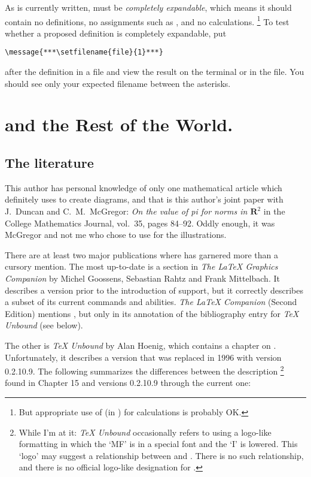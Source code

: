 \documentclass[letterpaper]{article}
\begin{document}
As \mfp{} is currently written,  must be
\emph{completely expandable}, which means it should contain no
definitions, no assignments such as , and no
calculations.%
    \footnote{But appropriate use of  (in \eTeX) for
    calculations is probably OK.}
To test whether a proposed definition is completely
expandable, put
\begin{verbatim}
\message{***\setfilename{file}{1}***}
\end{verbatim}
after the definition in a  file and view the result on the
terminal or in the  file. You should see only your expected
filename between the asterisks.


\section{ and the Rest of the World.}

\subsection{The literature}

This author has personal knowledge of only one mathematical article
which definitely uses \mfp{} to create diagrams, and that is this
author's joint paper with J.~Duncan and C.~M.~McGregor: \textit{On the
value of pi for norms in $\mathbf{R}^2$} in the College Mathematics
Journal, vol.~35, pages 84--92. Oddly enough, it was McGregor and not me
who chose to use \mfp{} for the illustrations.

There are at least two major publications where \mfp{} has garnered more
than a cursory mention. The most up-to-date is a section in \textit{The
\LaTeX{} Graphics Companion} by Michel Goossens, Sebastian Rahtz and
Frank Mittelbach. It describes a version prior to the introduction of
\MP{} support, but it correctly describes a subset of its current
commands and abilities. \textit{The \LaTeX{} Companion} (Second Edition)
mentions \mfp{}, but only in its annotation of the bibliography entry
for \textit{\TeX{} Unbound} (see below).

The other is \textit{\TeX{} Unbound} by Alan Hoenig, which contains a
chapter on \mfp{}. Unfortunately, it describes a version that was
replaced in 1996 with version 0.2.10.9.  The following summarizes the
differences between the description%
    \footnote{While I'm at it: \textit{\TeX{} Unbound} occasionally
    refers to \mfp{} using a logo-like formatting in which the `MF' is
    in a special font and the `I' is lowered. This `logo' may suggest
    a relationship between \mfp{} and \PiCTeX{}. There is no such
    relationship, and there is no official logo-like designation for
    \mfp{}.} %
found in Chapter 15 and \mfp{} versions 0.2.10.9 through the
current one:
\end{document}

